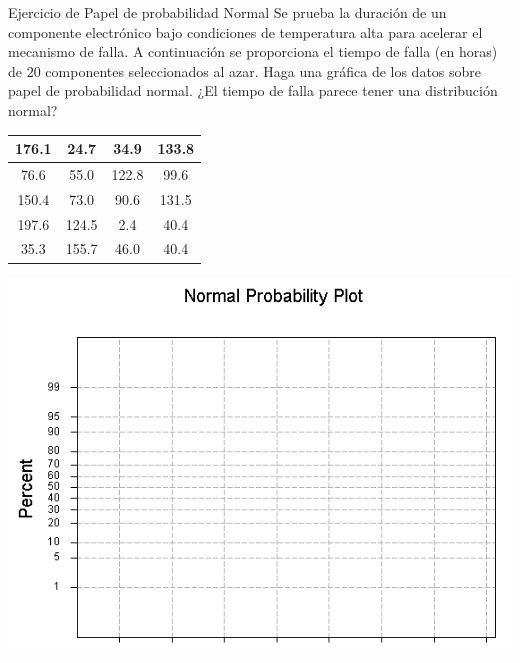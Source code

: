 \documentclass[
  10pt,
  ignorenonframetext,
]{beamer}
\begin{document}
\begin{frame}{}
\protect\hypertarget{section-43}{}
\begin{block}{Ejercicio de Papel de probabilidad Normal}
\protect\hypertarget{ejercicio-de-papel-de-probabilidad-normal}{}
Se prueba la duración de un componente electrónico bajo condiciones de
temperatura alta para acelerar el mecanismo de falla. A continuación se
proporciona el tiempo de falla (en horas) de \(20\) componentes
seleccionados al azar. Haga una gráfica de los datos sobre papel de
probabilidad normal. ¿El tiempo de falla parece tener una distribución
normal?

\begin{table}
\centering\begingroup\fontsize{9}{11}\selectfont

\begin{tabular}{c|c|c|c}
\hline
176.1 & 24.7 & 34.9 & 133.8\\
\hline
76.6 & 55.0 & 122.8 & 99.6\\
\hline
150.4 & 73.0 & 90.6 & 131.5\\
\hline
197.6 & 124.5 & 2.4 & 40.4\\
\hline
35.3 & 155.7 & 46.0 & 40.4\\
\hline
\end{tabular}
\endgroup{}
\end{table}
\end{block}
\end{frame}

\begin{frame}{}
\protect\hypertarget{section-44}{}
\includegraphics[width=2\textwidth,height=\textheight]{figuras/probpaperLandscape2.png}
\end{frame}
\end{document}
